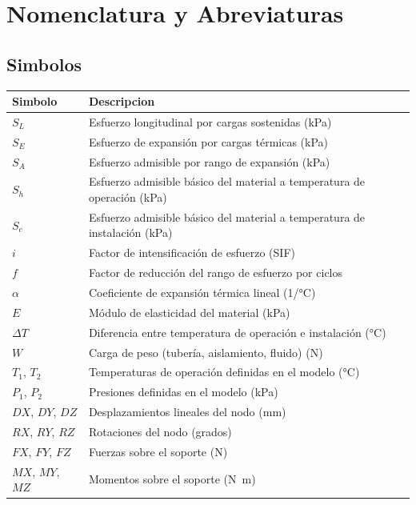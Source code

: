 \section*{Nomenclatura y Abreviaturas}

\subsection*{Simbolos}

\noindent\begin{tabularx}{\textwidth}{@{}l>{\raggedright\arraybackslash}X@{}}
	\toprule
	\textbf{Simbolo} & \textbf{Descripcion} \\
	\midrule
	$S_L$ & Esfuerzo longitudinal por cargas sostenidas (kPa) \\
	$S_E$ & Esfuerzo de expansi\'{o}n por cargas t\'{e}rmicas (kPa) \\
	$S_A$ & Esfuerzo admisible por rango de expansi\'{o}n (kPa) \\
	$S_h$ & Esfuerzo admisible b\'{a}sico del material a temperatura de operaci\'{o}n (kPa) \\
	$S_c$ & Esfuerzo admisible b\'{a}sico del material a temperatura de instalaci\'{o}n (kPa) \\
	$i$ & Factor de intensificaci\'{o}n de esfuerzo (SIF) \\
	$f$ & Factor de reducci\'{o}n del rango de esfuerzo por ciclos \\
	$\alpha$ & Coeficiente de expansi\'{o}n t\'{e}rmica lineal (1/\si{\celsius}) \\
	$E$ & M\'{o}dulo de elasticidad del material (kPa) \\
	$\Delta T$ & Diferencia entre temperatura de operaci\'{o}n e instalaci\'{o}n (\si{\celsius}) \\
	$W$ & Carga de peso (tuber\'{i}a, aislamiento, fluido) (N) \\
	$T_1$, $T_2$ & Temperaturas de operaci\'{o}n definidas en el modelo (\si{\celsius}) \\
	$P_1$, $P_2$ & Presiones definidas en el modelo (kPa) \\
	$DX$, $DY$, $DZ$ & Desplazamientos lineales del nodo (mm) \\
	$RX$, $RY$, $RZ$ & Rotaciones del nodo (grados) \\
	$FX$, $FY$, $FZ$ & Fuerzas sobre el soporte (N) \\
	$MX$, $MY$, $MZ$ & Momentos sobre el soporte (\si{N.m}) \\
	\bottomrule
\end{tabularx}

